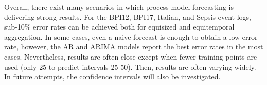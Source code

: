 Overall, there exist many scenarios in which process model forecasting is delivering strong results.
For the BPI12, BPI17, Italian, and Sepsis event logs, sub-10\% error rates can be achieved both for equisized and equitemporal aggregation.
In some cases, even a naive forecast is enough to obtain a low error rate, however, the AR and ARIMA models report the best error rates in the most cases.
Nevertheless, results are often close except when fewer training points are used (only 25 to predict intervals 25-50).
Then, results are often varying widely.
In future attempts, the confidence intervals will also be investigated.











